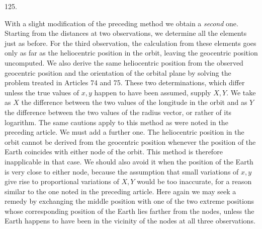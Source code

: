 \par{}\medskip
\begin{center}\hypertarget{native-172-article125}{}125.\end{center}
With a slight modification of the preceding method we obtain a \emph{second} one. Starting from the distances at two observations, we determine all the elements just as before. For the third observation, the calculation from these elements goes only as far as the heliocentric position in the orbit, leaving the geocentric position uncomputed. We also derive the same heliocentric position from the observed geocentric position and the orientation of the orbital plane by solving the problem treated in Articles 74 and 75. These two determinations, which differ unless the true values of $x,y$ happen to have been assumed, supply $X,Y$. We take as $X$ the difference between the two values of the longitude in the orbit and as $Y$ the difference between the two values of the radius vector, or rather of its logarithm. The same cautions apply to this method as were noted in the preceding article. We must add a further one. The heliocentric position in the orbit cannot be derived from the geocentric position whenever the position of the Earth coincides with either node of the orbit. This method is therefore inapplicable in that case. We should also avoid it when the position of the Earth is very close to either node, because the assumption that small variations of $x,y$ give rise to proportional variations of $X,Y$ would be too inaccurate, for a reason similar to the one noted in the preceding article. Here again we may seek a remedy by exchanging the middle position with one of the two extreme positions whose corresponding position of the Earth lies farther from the nodes, unless the Earth happens to have been in the vicinity of the nodes at all three observations.

